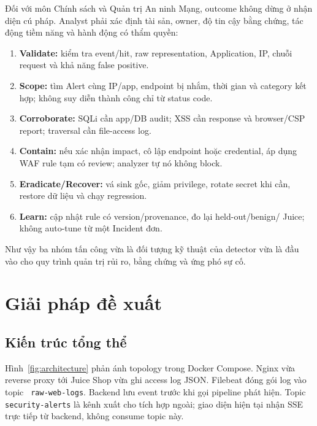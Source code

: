 \documentclass[runningheads]{report-template/llncs}
\newcommand{\code}[1]{\texttt{\small\hyphenchar\font=45 #1}}
\begin{document}
Đối với môn Chính sách và Quản trị An ninh Mạng, outcome không dừng ở
nhận diện cú pháp. Analyst phải xác định tài sản, owner, độ tin cậy bằng
chứng, tác động tiềm năng và hành động có thẩm quyền:
\begin{enumerate}
  \item \textbf{Validate:} kiểm tra event/hit, raw representation,
  Application, IP, chuỗi request và khả năng false positive.
  \item \textbf{Scope:} tìm Alert cùng IP/app, endpoint bị nhắm, thời gian
  và category kết hợp; không suy diễn thành công chỉ từ status code.
  \item \textbf{Corroborate:} SQLi cần app/DB audit; XSS cần response và
  browser/CSP report; traversal cần file-access log.
  \item \textbf{Contain:} nếu xác nhận impact, cô lập endpoint hoặc
  credential, áp dụng WAF rule tạm có review; analyzer tự nó không block.
  \item \textbf{Eradicate/Recover:} vá sink gốc, giảm privilege, rotate
  secret khi cần, restore dữ liệu và chạy regression.
  \item \textbf{Learn:} cập nhật rule có version/provenance, đo lại
  held-out/benign/ Juice; không auto-tune từ một Incident đơn.
\end{enumerate}

Như vậy ba nhóm tấn công vừa là đối tượng kỹ thuật của detector vừa là
đầu vào cho quy trình quản trị rủi ro, bằng chứng và ứng phó sự cố.

\section{Giải pháp đề xuất}

\subsection{Kiến trúc tổng thể}

Hình~\ref{fig:architecture} phản ánh topology trong Docker Compose.
Nginx vừa reverse proxy tới Juice Shop vừa ghi access log JSON. Filebeat
đóng gói log vào topic \code{raw-web-logs}. Backend lưu event trước khi
gọi pipeline phát hiện. Topic \code{security-alerts} là kênh xuất cho
tích hợp ngoài; giao diện hiện tại nhận SSE trực tiếp từ backend, không
consume topic này.
\end{document}
